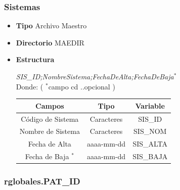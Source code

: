 \documentclass[a4paper,10pt,titlepage]{article}
\begin{document}
		\subsubsection{Sistemas}

			\begin {itemize}
				\item \textbf{Tipo} {Archivo Maestro}
				\item \textbf{Directorio} {MAEDIR}
				\item \textbf{Estructura} {\textit{SIS\_ID;NombreSistema;FechaDeAlta;FechaDeBaja$^*$}\\
					Donde: (	$^*$campo  cd ..opcional )\ 
					\begin{table}[H]
					\centering
					\begin{tabular}{| c | c | c |}
						\hline
						Campos 	& Tipo & Variable\\
						\hline
							Código de Sistema & Caracteres & SIS\_ID \\
						\hline 
						 Nombre de Sistema & Caracteres 	& SIS\_NOM\\
						\hline
						Fecha de Alta & aaaa-mm-dd & SIS\_ALTA\\
						\hline
						Fecha de Baja $^*$& aaaa-mm-dd & SIS\_BAJA\\
						\hline
					\end{tabular}
					\end{table}
				}
			\end{itemize}


		\subsubsection{rglobales.PAT\_ID}
\end{document}
